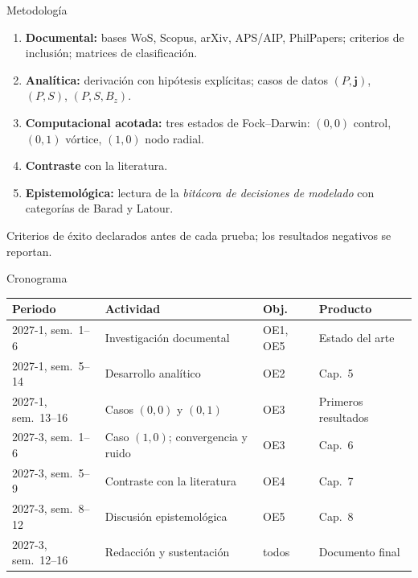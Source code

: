 \documentclass[aspectratio=169,10pt]{beamer}
\newcommand{\jv}{\mathbf{j}}
\begin{document}
\begin{frame}{Metodología}
  \begin{enumerate}
    \item \textbf{Documental:} bases WoS, Scopus, arXiv, APS/AIP, PhilPapers; criterios de inclusión; matrices de
          clasificación.
    \item \textbf{Analítica:} derivación con hipótesis explícitas; casos de datos $(P,\jv)$, $(P,S)$, $(P,S,B_z)$.
    \item \textbf{Computacional acotada:} tres estados de Fock--Darwin:
          $(0,0)$ control, $(0,1)$ vórtice, $(1,0)$ nodo radial.
    \item \textbf{Contraste} con la literatura.
    \item \textbf{Epistemológica:} lectura de la \emph{bitácora de decisiones de modelado} con categorías de Barad y Latour.
  \end{enumerate}
  \vspace{0.3em}
  Criterios de éxito declarados antes de cada prueba; los resultados negativos se reportan.
\end{frame}

\begin{frame}{Cronograma}
  \small
  \begin{tabular}{@{}llll@{}}
    \toprule
    \textbf{Periodo} & \textbf{Actividad} & \textbf{Obj.} & \textbf{Producto} \\
    \midrule
    2027-1, sem.~1--6 & Investigación documental & OE1, OE5 & Estado del arte \\
    2027-1, sem.~5--14 & Desarrollo analítico & OE2 & Cap.~5 \\
    2027-1, sem.~13--16 & Casos $(0,0)$ y $(0,1)$ & OE3 & Primeros resultados \\
    2027-3, sem.~1--6 & Caso $(1,0)$; convergencia y ruido & OE3 & Cap.~6 \\
    2027-3, sem.~5--9 & Contraste con la literatura & OE4 & Cap.~7 \\
    2027-3, sem.~8--12 & Discusión epistemológica & OE5 & Cap.~8 \\
    2027-3, sem.~12--16 & Redacción y sustentación & todos & Documento final \\
    \bottomrule
  \end{tabular}
\end{frame}
\end{document}
